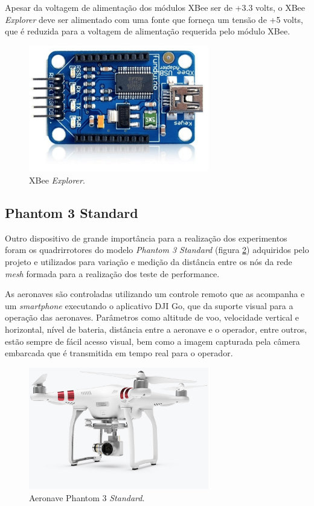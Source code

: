 Apesar da voltagem de alimentação dos módulos XBee ser de +3.3 volts, o XBee \emph{Explorer} deve ser alimentado com uma fonte que forneça um tensão de +5 volts, que é reduzida para a voltagem de alimentação requerida pelo módulo XBee.

\begin{figure}[h!] 
\center
\includegraphics[width=0.7\textwidth]{xbeeexplorer.png}
\caption{XBee \emph{Explorer}.} 
\label{fig:xbeeexplorer}
\end{figure} 

\subsection{Phantom 3 Standard}

Outro dispositivo de grande importância para a realização dos experimentos foram os quadrirrotores do modelo \emph{Phantom 3 Standard} (figura \ref{fig:phantom}) adquiridos pelo projeto e utilizados para variação e medição da distância entre os nós da rede \emph{mesh} formada para a realização dos teste de performance.

As aeronaves são controladas utilizando um controle remoto que as acompanha e um \emph{smartphone} executando o aplicativo DJI Go, que da suporte visual para a operação das aeronaves. Parâmetros como altitude de voo, velocidade vertical e horizontal, nível de bateria, distância entre a aeronave e o operador, entre outros, estão sempre de fácil acesso visual, bem como a imagem capturada pela câmera embarcada que é transmitida em tempo real para o operador. 

\begin{figure}[h!] 
\center
\includegraphics[width=0.7\textwidth]{phatom.jpg}
\caption{Aeronave Phantom 3 \emph{Standard}.} 
\label{fig:phantom}
\end{figure}

